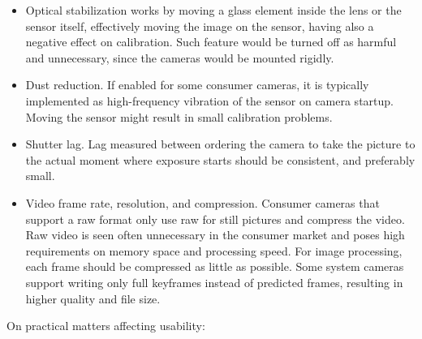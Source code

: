 \begin{itemize}
	\item Optical stabilization works by moving a glass element inside the lens or the sensor itself, effectively moving the image on the sensor, having also a negative effect on calibration.
		Such feature would be turned off as harmful and unnecessary, since the cameras would be mounted rigidly.

	\item Dust reduction.
		If enabled for some consumer cameras, it is typically implemented as high-frequency vibration of the sensor on camera startup.
		Moving the sensor might result in small calibration problems.

	\item Shutter lag.
		Lag measured between ordering the camera to take the picture to the actual moment where exposure starts should be consistent, and preferably small.

	\item Video frame rate, resolution, and compression.
		Consumer cameras that support a raw format only use raw for still pictures and compress the video.
		Raw video is seen often unnecessary in the consumer market and poses high requirements on memory space and processing speed.
		For image processing, each frame should be compressed as little as possible.
		Some system cameras support writing only full keyframes instead of predicted frames, resulting in higher quality and file size.

\end{itemize}

On practical matters affecting usability:

